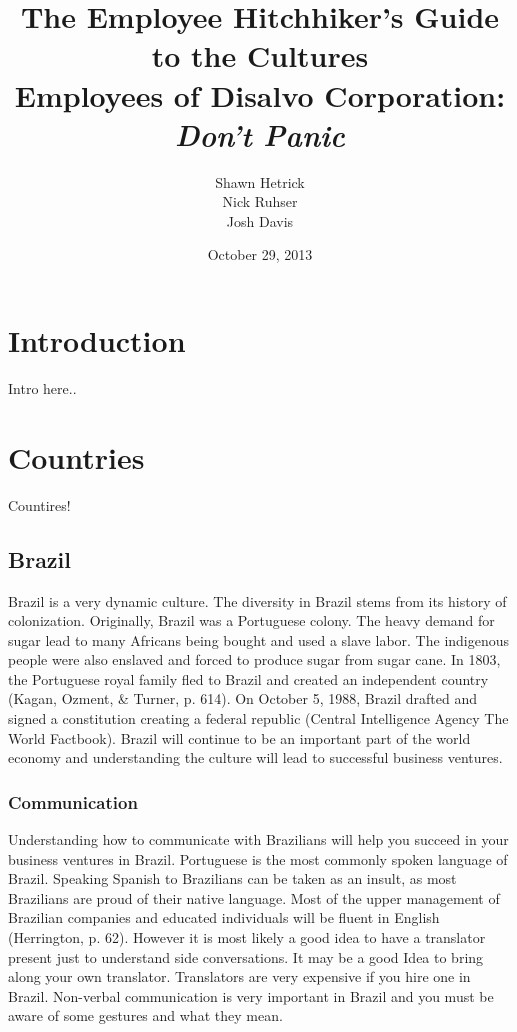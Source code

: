 \documentclass[11pt,a4paper,oneside]{report}
\title{
    \vspace{2in}
    \textmd{\textbf{\Huge The Employee Hitchhiker's Guide to the Cultures}}\\
    \vspace{2in}
    \vspace{0.1in}\Large{Employees of Disalvo Corporation: \textit{Don't Panic}}
    \vspace{3in}
}
\author{
    Shawn Hetrick
    \\
    Nick Ruhser
    \\
    Josh Davis
    \vspace{1in}
}
\date{October 29, 2013}
\begin{document}
\thispagestyle{empty}
\renewcommand\headrulewidth{0pt}
\renewcommand\footrulewidth{0pt}

\maketitle

\newpage

\renewcommand\headrulewidth{0.4pt}
\renewcommand\footrulewidth{0.4pt}

\setcounter{secnumdepth}{0}
\setcounter{tocdepth}{3}


{\Large \tableofcontents}

\pagebreak

\doublespacing
{}

\section{Introduction}\label{first}
Intro here..

\section{Countries}\label{first}
Countires!

\subsection{Brazil}\label{second}

Brazil is a very dynamic culture. The diversity in Brazil stems from its
history of colonization. Originally, Brazil was a Portuguese colony.  The
heavy demand for sugar lead to many Africans being bought and used a slave
labor. The indigenous people were also enslaved and forced to produce sugar
from sugar cane. In 1803, the Portuguese royal family fled to Brazil and
created an independent country (Kagan, Ozment, \& Turner, p. 614). On
October 5, 1988, Brazil drafted and signed a constitution creating a
federal republic (Central Intelligence Agency The World Factbook). Brazil
will continue to be an important part of the world economy and
understanding the culture will lead to successful business ventures.

\subsubsection{Communication}\label{third}
Understanding how to communicate with Brazilians will help you succeed in
your business ventures in Brazil. Portuguese is the most commonly spoken
language of Brazil. Speaking Spanish to Brazilians can be taken as an
insult, as most Brazilians are proud of their native language.  Most of the
upper management of Brazilian companies and educated individuals will be
fluent in English (Herrington, p. 62). However it is most likely a good
idea to have a translator present just to understand side conversations. It
may be a good Idea to bring along your own translator. Translators are very
expensive if you hire one in Brazil. Non-verbal communication is very
important in Brazil and you must be aware of some gestures and what they
mean.
\end{document}
